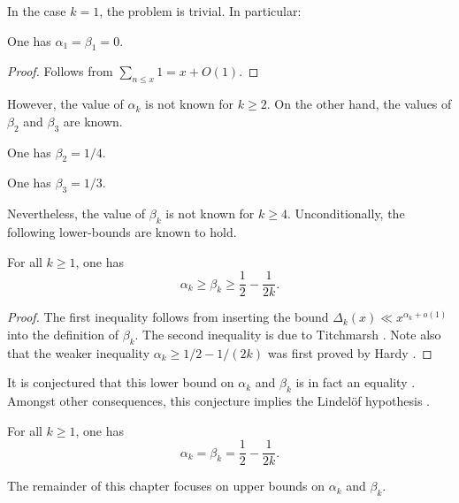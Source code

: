 In the case $k = 1$, the problem is trivial. In particular:

\begin{lemma}[$d_1$ exponent]\label{divisor-1} One has $\alpha_1=\beta_1=0$.
\end{lemma}
\begin{proof}
Follows from $\sum_{n \le x}1 = x + O(1)$.
\end{proof}

However, the value of $\alpha_k$ is not known for $k \ge 2$. On the other hand, the values of $\beta_2$ and $\beta_3$ are known.

\begin{theorem}\label{avg-divisor-2}
One has $\beta_2 = 1/4$.
\end{theorem}
\begin{theorem}\label{avg-divisor-3}
One has $\beta_3 = 1/3$.
\end{theorem}

Nevertheless, the value of $\beta_k$ is not known for $k \ge 4$. Unconditionally, the following lower-bounds are known to hold.

\begin{lemma}\label{divisor-lower}
For all $k \geq 1$, one has
\[
\alpha_k \geq \beta_k \geq \frac{1}{2} - \frac{1}{2k}.
\]
\end{lemma}
\begin{proof}The first inequality follows from inserting the bound $\Delta_k(x) \ll x^{\alpha_k + o(1)}$ into the definition of $\beta_k$. The second inequality is due to Titchmarsh \cite{titchmarsh_divisor_1938}. Note also that the weaker inequality $\alpha_k \ge 1/2 - 1/(2k)$ was first proved by Hardy \cite{hardy_divisor_1916}.
\end{proof}

It is conjectured that this lower bound on $\alpha_k$ and $\beta_k$ is in fact an equality \cite[p.\ 320]{titchmarsh_theory_1986}. Amongst other consequences, this conjecture implies the Lindel\"of hypothesis \cite[Chapter XII]{titchmarsh_theory_1986}.
\begin{conjecture}
For all $k \geq 1$, one has
\[
\alpha_k = \beta_k = \frac{1}{2} - \frac{1}{2k}.
\]
\end{conjecture}

The remainder of this chapter focuses on upper bounds on $\alpha_k$ and $\beta_k$.

